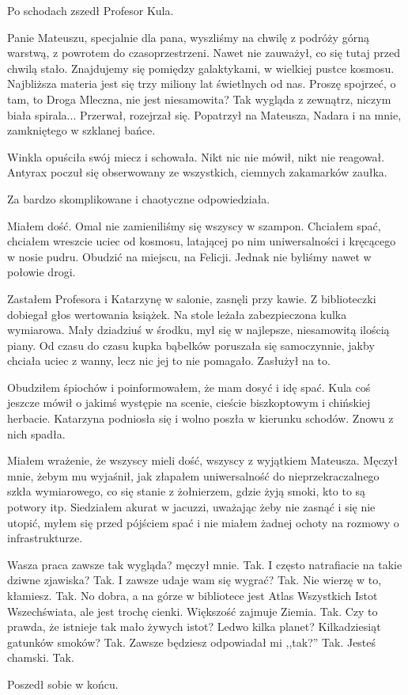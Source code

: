 Po schodach zszedł Profesor Kula.
\begin{dialogue}
\ds{} Panie Mateuszu, specjalnie dla pana, wyszliśmy na chwilę z podróży górną warstwą, z powrotem do czasoprzestrzeni. \dm{} Nawet nie zauważył, co się tutaj przed chwilą stało.
\dm{} Znajdujemy się pomiędzy galaktykami,  w wielkiej pustce kosmosu. Najbliższa materia jest się trzy miliony lat świetlnych od nas. Proszę spojrzeć, 
o tam, to Droga Mleczna, nie jest niesamowita? Tak wygląda z zewnątrz, niczym biała spirala... \dm{} Przerwał, rozejrzał się. Popatrzył na Mateusza, Nadara i na mnie, zamkniętego w szklanej bańce.
\end{dialogue}

\divider{}

Winkla opuściła swój miecz i schowała. 
Nikt nic nie mówił, nikt nie reagował. 
Antyrax poczuł się obserwowany ze wszystkich, ciemnych zakamarków zaułka.
\begin{dialogue}
\ds{} Za bardzo skomplikowane i chaotyczne \dm{} odpowiedziała.
\end{dialogue}

\divider{}

Miałem dość. Omal nie zamieniliśmy się wszyscy w szampon.
Chciałem spać, chciałem wreszcie uciec od kosmosu, latającej po nim uniwersalności i kręcącego w nosie pudru.
Obudzić na miejscu, na Felicji.
Jednak nie byliśmy nawet w połowie drogi.

Zastałem Profesora i Katarzynę w salonie, zasnęli przy kawie.
Z biblioteczki dobiegał głos wertowania książek.
Na stole leżała zabezpieczona kulka wymiarowa. Mały dziadziuś w środku, mył się w najlepsze, niesamowitą ilością piany.
Od czasu do czasu kupka bąbelków poruszała się samoczynnie, jakby chciała uciec z wanny, lecz nic jej to nie pomagało.
Zasłużył na to.

Obudziłem śpiochów i poinformowałem, że mam dosyć i idę spać.
Kula coś jeszcze mówił o jakimś występie na scenie, cieście biszkoptowym i chińskiej herbacie. 
Katarzyna podniosła się i wolno poszła w kierunku schodów.
Znowu z nich spadła.

Miałem wrażenie, że wszyscy mieli dość, wszyscy z wyjątkiem Mateusza.
Męczył mnie, żebym mu wyjaśnił, jak złapałem uniwersalność do nieprzekraczalnego szkła wymiarowego,
co się stanie z żołnierzem, gdzie żyją smoki, kto to są potwory itp.
Siedziałem akurat w jacuzzi, uważając żeby nie zasnąć i się nie utopić, myłem się przed pójściem spać i nie miałem żadnej ochoty na rozmowy o infrastrukturze.
\begin{dialogue}
\ds{} Wasza praca zawsze tak wygląda? \dm{} męczył mnie.
\ds{} Tak.
\ds{} I często natrafiacie na takie dziwne zjawiska?
\ds{} Tak.
\ds{} I zawsze udaje wam się wygrać?
\ds{} Tak.
\ds{} Nie wierzę w to, kłamiesz.
\ds{} Tak.
\ds{} No dobra, a na górze w bibliotece jest Atlas Wszystkich Istot Wszechświata, ale jest trochę cienki. Większość zajmuje Ziemia.
\ds{} Tak.
\ds{} Czy to prawda, że istnieje tak mało żywych istot? Ledwo kilka planet? Kilkadziesiąt gatunków smoków?
\ds{} Tak.
\ds{} Zawsze będziesz odpowiadał mi ,,tak?''
\ds{} Tak.
\ds{} Jesteś chamski.
\ds{} Tak.
\end{dialogue}
Poszedł sobie w końcu.

